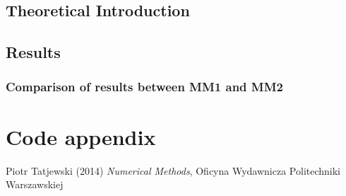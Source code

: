 \documentclass[12pt]{report}
\begin{document}
\section{Theoretical Introduction}
\section{Results}
\subsection{Comparison of results between MM1 and MM2}

\chapter{Code appendix}

\begin{thebibliography}{9}
Piotr Tatjewski (2014) \emph{Numerical Methods}, Oficyna Wydawnicza Politechniki Warszawskiej
\end{thebibliography}
\end{document}
